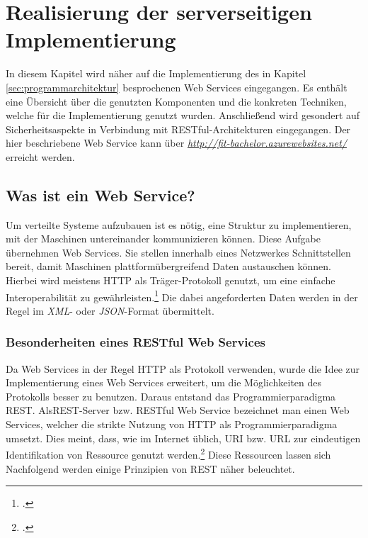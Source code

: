 \chapter{Realisierung der serverseitigen Implementierung}
\label{cha:server-impl}
In diesem Kapitel wird näher auf die Implementierung des in Kapitel \ref{sec:programmarchitektur} besprochenen Web Services eingegangen. Es enthält eine Übersicht über die genutzten Komponenten und die konkreten Techniken, welche für die Implementierung genutzt wurden. Anschließend wird gesondert auf Sicherheitsaspekte in Verbindung mit \ac{REST}ful-Architekturen eingegangen. Der hier beschriebene Web Service kann über  \textit{\href{http://fit-bachelor.azurewebsites.net/}{http://fit-bachelor.azurewebsites.net/}} erreicht werden. 
\section{Was ist ein Web Service?}
\label{sec:definition-webservice}
Um verteilte Systeme aufzubauen ist es nötig, eine Struktur zu implementieren, mit der Maschinen untereinander kommunizieren können. Diese Aufgabe übernehmen Web Services. Sie stellen innerhalb eines Netzwerkes Schnittstellen bereit, damit Maschinen plattformübergreifend Daten austauschen können. Hierbei wird meistens \ac{HTTP} als Träger-Protokoll genutzt, um eine einfache Interoperabilität zu gewährleisten.\footcite{Definition-Webservice} Die dabei angeforderten Daten werden in der Regel im \textit{\ac{XML}}- oder \textit{\ac{JSON}}-Format übermittelt. 
\subsection{Besonderheiten eines RESTful Web Services}
\label{sec:definition-rest}
Da Web Services in der Regel \ac{HTTP} als Protokoll verwenden, wurde die Idee zur Implementierung eines Web Services erweitert, um die Möglichkeiten des Protokolls besser zu benutzen. Daraus entstand das Programmierparadigma \ac{REST}. Als\ac{REST}-Server bzw. \ac{REST}ful Web Service bezeichnet man einen Web Services, welcher die strikte Nutzung von \ac{HTTP} als Programmierparadigma umsetzt.  Dies meint, dass, wie im Internet üblich, \ac{URI} bzw. \ac{URL} zur eindeutigen Identifikation von Ressource genutzt werden.\footcite[S. 26ff.]{REST-und-HTTP} Diese Ressourcen lassen sich Nachfolgend werden einige Prinzipien von \ac{REST} näher beleuchtet.

